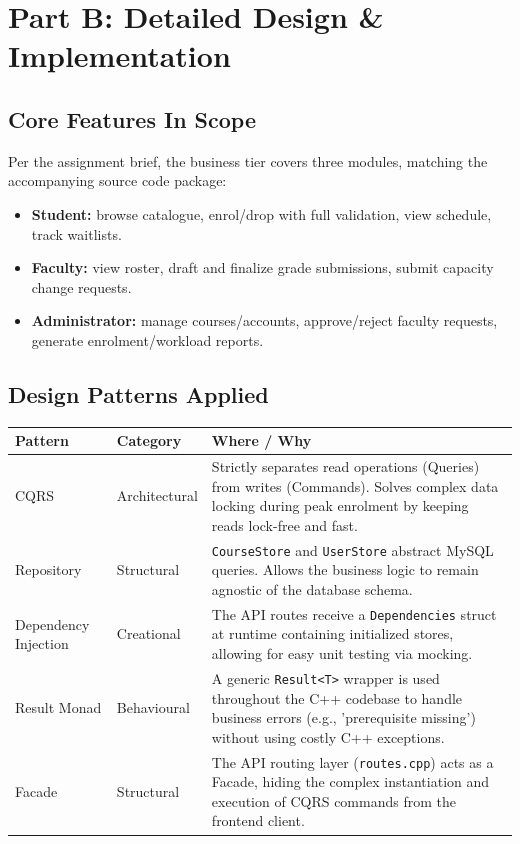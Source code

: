 \documentclass[12pt,a4paper]{article}
\begin{document}
\newpage
\section{Part B: Detailed Design \& Implementation}
\subsection{Core Features In Scope}
Per the assignment brief, the business tier covers three modules, matching the accompanying source code package:
\begin{itemize}
    \item \textbf{Student:} browse catalogue, enrol/drop with full validation, view schedule, track waitlists.
    \item \textbf{Faculty:} view roster, draft and finalize grade submissions, submit capacity change requests.
    \item \textbf{Administrator:} manage courses/accounts, approve/reject faculty requests, generate enrolment/workload reports.
\end{itemize}

\subsection{Design Patterns Applied}
\begin{table}[h]
\centering
\begin{tabular}{|p{3cm}|p{2cm}|p{10cm}|}
\hline
\textbf{Pattern} & \textbf{Category} & \textbf{Where / Why} \\
\hline
CQRS & Architectural & Strictly separates read operations (Queries) from writes (Commands). Solves complex data locking during peak enrolment by keeping reads lock-free and fast. \\
\hline
Repository & Structural & \texttt{CourseStore} and \texttt{UserStore} abstract MySQL queries. Allows the business logic to remain agnostic of the database schema. \\
\hline
Dependency Injection & Creational & The API routes receive a \texttt{Dependencies} struct at runtime containing initialized stores, allowing for easy unit testing via mocking. \\
\hline
Result Monad & Behavioural & A generic \texttt{Result<T>} wrapper is used throughout the C++ codebase to handle business errors (e.g., 'prerequisite missing') without using costly C++ exceptions. \\
\hline
Facade & Structural & The API routing layer (\texttt{routes.cpp}) acts as a Facade, hiding the complex instantiation and execution of CQRS commands from the frontend client. \\
\hline
\end{tabular}
\end{table}
\end{document}
